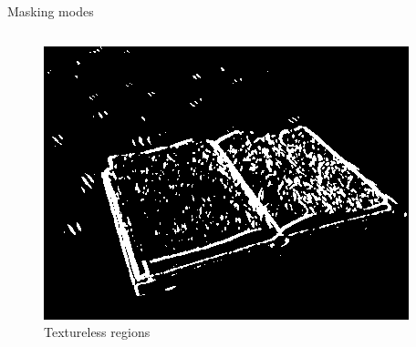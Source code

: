 \documentclass[10pt]{beamer}
\begin{document}
\begin{frame}[fragile]{Masking modes}
\begin{columns}[T,onlytextwidth]
{\begin{figure}
      \includegraphics[width=1.0\textwidth]{images/book-mask-tex.png}
      \caption{Textureless regions}
      \end{figure}
    }
  \end{columns}
\end{frame}
\end{document}
